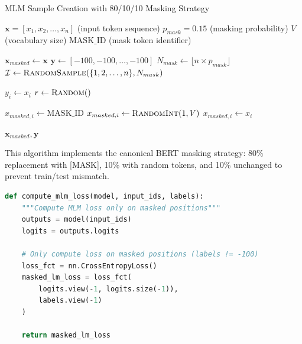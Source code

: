 \begin{algorithm}[h]
\caption{MLM Sample Creation with 80/10/10 Masking Strategy}
\begin{algorithmic}[1]
\Require $\mathbf{x} = [x_1, x_2, \ldots, x_n]$ (input token sequence)
\Require $p_{mask} = 0.15$ (masking probability)
\Require $V$ (vocabulary size)
\Require $\text{MASK\_ID}$ (mask token identifier)

\State $\mathbf{x}_{masked} \gets \mathbf{x}$ 
\State $\mathbf{y} \gets [-100, -100, \ldots, -100]$ 
\State $N_{mask} \gets \lfloor n \times p_{mask} \rfloor$ 
\State $\mathcal{I} \gets \textsc{RandomSample}(\{1, 2, \ldots, n\}, N_{mask})$ 

 
    \State $y_i \gets x_i$ 
    \State $r \gets \textsc{Random}()$ \Comment{Draw random number $r \in [0, 1)$}
    
     
        \State $x_{masked,i} \gets \text{MASK\_ID}$
     
        \State $x_{masked,i} \gets \textsc{RandomInt}(1, V)$
    \Else {}
        \State $x_{masked,i} \gets x_i$ 
    \EndIf
\EndFor

\State \Return $\mathbf{x}_{masked}, \mathbf{y}$
\end{algorithmic}
\end{algorithm}

This algorithm implements the canonical BERT masking strategy: 80\% replacement with [MASK], 10\% with random tokens, and 10\% unchanged to prevent train/test mismatch.

\begin{lstlisting}[language=Python, caption={MLM loss computation for masked positions}]
def compute_mlm_loss(model, input_ids, labels):
    """Compute MLM loss only on masked positions"""
    outputs = model(input_ids)
    logits = outputs.logits
    
    # Only compute loss on masked positions (labels != -100)
    loss_fct = nn.CrossEntropyLoss()
    masked_lm_loss = loss_fct(
        logits.view(-1, logits.size(-1)), 
        labels.view(-1)
    )
    
    return masked_lm_loss
\end{lstlisting}

